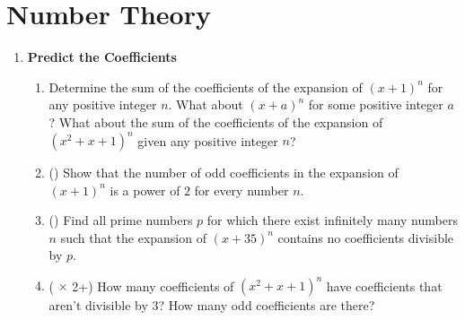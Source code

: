 \documentclass[11pt]{scrartcl}
\begin{document}
\newpage
\section{Number Theory}
\begin{enumerate}[label=\textbf{N\arabic*}.]
    \item \textbf{Predict the Coefficients}
    \begin{enumerate}
        \item Determine the sum of the coefficients of the expansion of $(x + 1)^n$ for any positive integer $n$. What about $(x + a)^n$ for some positive integer $a$? What about the sum of the coefficients of the expansion of $(x^2 + x + 1)^n$ given any positive integer $n$?
        
        \item (\fullchili) Show that the number of odd coefficients in the expansion of $(x+1)^n$ is a power of $2$ for every number $n$.

        \item (\fullchili) Find all prime numbers $p$ for which there exist infinitely many numbers $n$ such that the expansion of $(x+35)^n$ contains no coefficients divisible by $p$.
        
        \item (\fullchili \hspace{1pt} $\times$ 2+) How many coefficients of $(x^2 + x + 1)^n$ have coefficients that aren't divisible by $3$? How many odd coefficients are there?
    \end{enumerate}
\end{enumerate}
\end{document}
